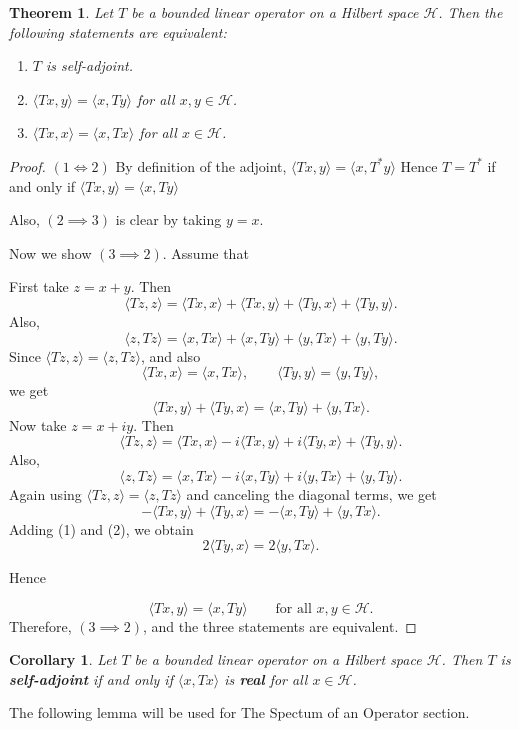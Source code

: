 \documentclass{report}
\newtheorem{thm}{Theorem}
\newtheorem{cor}{Corollary}
\begin{document}
  \begin{thm}
    Let $T$ be a bounded linear operator on a Hilbert space $\mathcal{H}$. Then the following statements are equivalent:
    \begin{enumerate}
        \item $T$ is self-adjoint.
        \item $\langle Tx,y \rangle = \langle x,Ty \rangle$ for all $x,y \in \mathcal{H}$.
        \item $\langle Tx,x \rangle = \langle x,Tx \rangle$ for all $x \in \mathcal{H}$.
    \end{enumerate}
  \end{thm}

  \begin{proof}
$(1\iff 2)$ By definition of the adjoint,
$
\langle Tx,y\rangle=\langle x,T^*y\rangle 
$
Hence $T=T^*$ if and only if
$
\langle Tx,y\rangle=\langle x,Ty\rangle
$

Also, $(2\implies 3)$ is clear by taking $y=x$.



Now we show $(3\implies 2)$. Assume that

First take $z=x+y$. Then
\[
\langle Tz,z\rangle
=
\langle Tx,x\rangle+\langle Tx,y\rangle+\langle Ty,x\rangle+\langle Ty,y\rangle.
\]
Also,
\[
\langle z,Tz\rangle
=
\langle x,Tx\rangle+\langle x,Ty\rangle+\langle y,Tx\rangle+\langle y,Ty\rangle.
\]
Since $\langle Tz,z\rangle=\langle z,Tz\rangle$, and also
\[
\langle Tx,x\rangle=\langle x,Tx\rangle,\qquad
\langle Ty,y\rangle=\langle y,Ty\rangle,
\]
we get
\[
\langle Tx,y\rangle+\langle Ty,x\rangle
=
\langle x,Ty\rangle+\langle y,Tx\rangle. \tag{1}
\]
Now take $z=x+iy$. Then
\[
\langle Tz,z\rangle
=
\langle Tx,x\rangle-i\langle Tx,y\rangle+i\langle Ty,x\rangle+\langle Ty,y\rangle.
\]
Also,
\[
\langle z,Tz\rangle
=
\langle x,Tx\rangle-i\langle x,Ty\rangle+i\langle y,Tx\rangle+\langle y,Ty\rangle.
\]
Again using $\langle Tz,z\rangle=\langle z,Tz\rangle$ and canceling the diagonal terms, we get
\[
-\langle Tx,y\rangle+\langle Ty,x\rangle
=
-\langle x,Ty\rangle+\langle y,Tx\rangle. \tag{2}
\]
Adding (1) and (2), we obtain
\[
2\langle Ty,x\rangle=2\langle y,Tx\rangle.
\]

Hence

\[
\langle Tx,y\rangle=\langle x,Ty\rangle
\qquad \text{for all }x,y\in\mathcal H.
\]
Therefore, $(3\implies 2)$, and the three statements are equivalent.
  \end{proof}

  \begin{cor}
Let $T$ be a bounded linear operator on a  Hilbert space $\mathcal{H}$. Then $T$ is \textbf{self-adjoint} if and only if $\langle x,Tx\rangle$ is \textbf{real} for all $x\in\mathcal{H}$.
  \end{cor}
The following lemma will be used for The Spectum of an Operator section.
\end{document}
